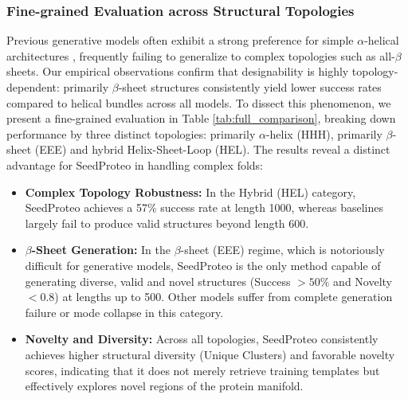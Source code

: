 \documentclass[]{bytedance_seed}
\begin{document}
\subsubsection{Fine-grained Evaluation across Structural Topologies}
Previous generative models often exhibit a strong preference for simple $\alpha$-helical architectures \cite{watsonNovoDesignProtein2023, quPallatomUnlockingNew2025}, frequently failing to generalize to complex topologies such as all-$\beta$ sheets. Our empirical observations confirm that designability is highly topology-dependent: primarily $\beta$-sheet structures consistently yield lower success rates compared to helical bundles across all models. To dissect this phenomenon, we present a fine-grained evaluation in Table \ref{tab:full_comparison}, breaking down performance by three distinct topologies: primarily $\alpha$-helix (HHH), primarily $\beta$-sheet (EEE) and hybrid Helix-Sheet-Loop (HEL). The results reveal a distinct advantage for SeedProteo in handling complex folds:

\begin{itemize}
    \item \textbf{Complex Topology Robustness:} In the Hybrid (HEL) category, SeedProteo achieves a 57\% success rate at length 1000, whereas baselines largely fail to produce valid structures beyond length 600.
    
    \item \textbf{$\beta$-Sheet Generation:} In the $\beta$-sheet (EEE) regime, which is notoriously difficult for generative models, SeedProteo is the only method capable of generating diverse, valid and novel structures (Success $>50\%$ and Novelty $<0.8$) at lengths up to 500. Other models suffer from complete generation failure or mode collapse in this category.
    
    \item \textbf{Novelty and Diversity:} Across all topologies, SeedProteo consistently achieves higher structural diversity (Unique Clusters) and favorable novelty scores, indicating that it does not merely retrieve training templates but effectively explores novel regions of the protein manifold.
\end{itemize}
\end{document}
